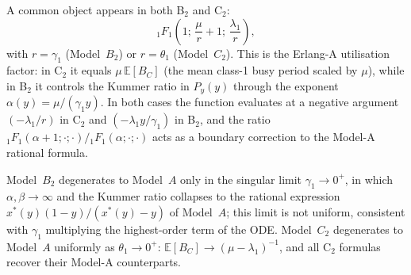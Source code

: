 A common object appears in both B$_2$ and C$_2$:
\begin{equation}
    {}_1F_1\!\left(1;\,\frac{\mu}{r}+1;\,\frac{\lambda_1}{r}\right),
    \label{eq:comp:1F1}
\end{equation}
with $r=\gamma_1$ (Model~$B_2$) or $r=\theta_1$ (Model~$C_2$).
This is the Erlang-A utilisation factor: in C$_2$ it equals $\mu\,\mathbb{E}[B_C]$
(the mean class-1 busy period scaled by $\mu$), while in B$_2$ it controls the
Kummer ratio in $P_y(y)$ through the exponent $\alpha(y)=\mu/(\gamma_1 y)$.
In both cases the function evaluates at a negative argument
$(-\lambda_1/r)$ in C$_2$ and $(-\lambda_1 y/\gamma_1)$ in B$_2$, and the
ratio ${}_1F_1(\alpha+1;\cdot;\cdot)/{}_1F_1(\alpha;\cdot;\cdot)$ acts as a
boundary correction to the Model-A rational formula.

Model~$B_2$ degenerates to Model~$A$ only in the singular limit
$\gamma_1\to0^+$, in which $\alpha,\beta\to\infty$ and the Kummer ratio
collapses to the rational expression $x^*(y)(1-y)/(x^*(y)-y)$ of Model~$A$;
this limit is not uniform, consistent with $\gamma_1$ multiplying the
highest-order term of the ODE.  Model~$C_2$ degenerates to Model~$A$ uniformly
as $\theta_1\to0^+$: $\mathbb{E}[B_C]\to(\mu-\lambda_1)^{-1}$, and all
C$_2$ formulas recover their Model-A counterparts.
